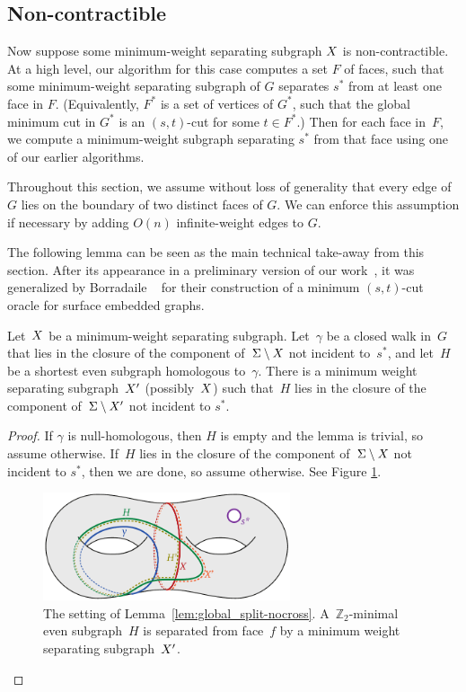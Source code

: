 \documentclass[letterpaper,review]{siamart190516}
\def\Z{\mathbb{Z}}
\begin{document}
{%

\subsection{Non-contractible}
\label{sec:global_non-contractible}

Now suppose some minimum-weight separating subgraph $X$ is non-contractible.  At a high level,
our algorithm for this case computes a set $F$ of faces, such that some minimum-weight separating
subgraph of $G$ separates $s^*$ from at least one face in $F$.  (Equivalently, $F^*$ is a set of
vertices of $G^*$, such that the global minimum cut in $G^*$ is an $(s,t)$-cut for some $t\in
F^*$.)  Then for each face in~$F$, we compute a minimum-weight subgraph separating $s^*$ from that
face using one of our earlier algorithms.

Throughout this section, we assume without loss of generality that every edge of $G$ lies on the boundary of two distinct faces of $G$.  We can enforce this assumption if necessary by adding $O(n)$ infinite-weight edges to $G$.

The following lemma can be seen as the main technical take-away from this section.
After its appearance in a preliminary version of our work~\cite{efn-gmcse-12}, it was
generalized by Borradaile \etal~\cite{benw-amcnt-16} for their construction of a minimum $(s,t)$-cut
oracle for surface embedded graphs.

\begin{lemma}
\label{lem:global_split-nocross}
Let~$X$ be a minimum-weight separating subgraph.
Let~$\gamma$ be a closed walk in~$G$ that lies in the closure of the component of~$\Sigma \setminus
X$ not incident to~$s^*$, and let~$H$
be a shortest even subgraph homologous to~$\gamma$.
There is a minimum weight separating subgraph~$X'$ (possibly~$X$) such
that~$H$ lies in the closure of the component of~$\Sigma \setminus X'$ not incident to $s^*$.
\end{lemma}

\begin{proof}
If $\gamma$ is null-homologous, then $H$ is empty and the lemma is trivial, so assume otherwise.
If~$H$ lies in the closure of the component of~$\Sigma \setminus X$ not incident to $s^*$, then we are done, so assume otherwise.  See Figure \ref{fig:global_nonsep-vs-shortsep}. 

\begin{figure}[ht]
\centering
\includegraphics[height=1.25in]{Fig/nonsep-vs-shortsep-2}
\caption{The setting of Lemma~\ref{lem:global_split-nocross}. A~$\Z_2$-minimal even subgraph~$H$ is separated from face~$f$ by a minimum weight separating subgraph~$X'$.}
\label{fig:global_nonsep-vs-shortsep}
\end{figure}


\end{proof}}
\end{document}
